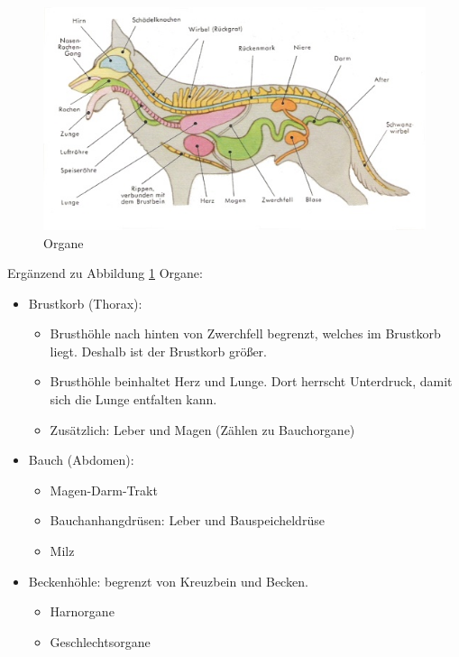     \begin{figure}[ht]
    \centering
    \includegraphics[width=1.0\textwidth]{./bilder/anatomie2.jpg}
    \caption{Organe}
    \label{Organe}
    \end{figure}

    Ergänzend zu Abbildung \ref{Organe} Organe:
    \begin{itemize}
        \item Brustkorb (Thorax):
        \begin{itemize}
            \item Brusthöhle nach hinten von Zwerchfell begrenzt, welches im Brustkorb liegt. Deshalb ist der Brustkorb größer.
            \item Brusthöhle beinhaltet Herz und Lunge. Dort herrscht Unterdruck, damit sich die Lunge entfalten kann.
            \item Zusätzlich: Leber und Magen (Zählen zu Bauchorgane)
        \end{itemize}
        \item Bauch (Abdomen):
        \begin{itemize}
            \item Magen-Darm-Trakt
            \item Bauchanhangdrüsen: Leber und Bauspeicheldrüse
            \item Milz
        \end{itemize}
        \item Beckenhöhle: begrenzt von Kreuzbein und Becken.
        \begin{itemize}
            \item Harnorgane
            \item Geschlechtsorgane
        \end{itemize}
    \end{itemize}



